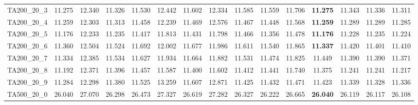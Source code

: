 \begin{tabular}{cc||ccccccccccccc}
TA200\_20\_3       & 11.275           & 12.340           & 11.326           & 11.530           & 12.442           & 11.602           & 12.334           & 11.585           & 11.559           & 11.706           & {\bf 11.275}     & 11.343           & 11.336           & 11.311          \\ 
TA200\_20\_4       & 11.259           & 12.303           & 11.313           & 11.458           & 12.239           & 11.469           & 12.576           & 11.467           & 11.448           & 11.568           & {\bf 11.259}     & 11.289           & 11.289           & 11.285          \\ 
TA200\_20\_5       & 11.176           & 12.233           & 11.235           & 11.417           & 11.813           & 11.431           & 11.798           & 11.466           & 11.356           & 11.478           & {\bf 11.176}     & 11.228           & 11.235           & 11.224          \\ 
TA200\_20\_6       & 11.360           & 12.504           & 11.524           & 11.692           & 12.002           & 11.677           & 11.986           & 11.611           & 11.540           & 11.865           & {\bf 11.337}     & 11.420           & 11.401           & 11.410          \\ 
TA200\_20\_7       & 11.334           & 12.385           & 11.534           & 11.627           & 11.934           & 11.664           & 11.882           & 11.531           & 11.474           & 11.825           & 11.449           & 11.390           & 11.390           & 11.371          \\ 
TA200\_20\_8       & 11.192           & 12.371           & 11.396           & 11.457           & 11.587           & 11.400           & 11.602           & 11.412           & 11.441           & 11.740           & 11.375           & 11.241           & 11.241           & 11.217          \\ 
TA200\_20\_9       & 11.284           & 12.298           & 11.380           & 11.525           & 13.259           & 11.607           & 12.871           & 11.425           & 11.432           & 11.471           & 11.423           & 11.339           & 11.328           & 11.336          \\ 
TA500\_20\_0       & 26.040           & 27.070           & 26.298           & 26.473           & 27.327           & 26.619           & 27.282           & 26.327           & 26.222           & 26.665           & {\bf 26.040}     & 26.119           & 26.117           & 26.108          \\ 

\end{tabular}
